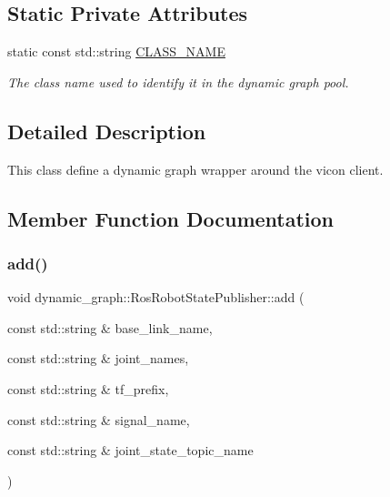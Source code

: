 \subsection*{Static Private Attributes}
\begin{DoxyCompactItemize}
\item 
\mbox{\label{classdynamic__graph_1_1RosRobotStatePublisher_a3794be6383ba4bc9a7412218a755f524}} 
static const std\+::string \hyperlink{classdynamic__graph_1_1RosRobotStatePublisher_a3794be6383ba4bc9a7412218a755f524}{C\+L\+A\+S\+S\+\_\+\+N\+A\+ME}
\begin{DoxyCompactList}\small\item\em The class name used to identify it in the dynamic graph pool. \end{DoxyCompactList}\end{DoxyCompactItemize}


\subsection{Detailed Description}
This class define a dynamic graph wrapper around the vicon client. 

\subsection{Member Function Documentation}
\mbox{\label{classdynamic__graph_1_1RosRobotStatePublisher_a92094934e53306e73b6fc13d1de61b3d}} 
\subsubsection{\texorpdfstring{add()}{add()}}
{\footnotesize\ttfamily void dynamic\+\_\+graph\+::\+Ros\+Robot\+State\+Publisher\+::add (\begin{DoxyParamCaption}\item[{const std\+::string \&}]{base\+\_\+link\+\_\+name,  }\item[{const std\+::string \&}]{joint\+\_\+names,  }\item[{const std\+::string \&}]{tf\+\_\+prefix,  }\item[{const std\+::string \&}]{signal\+\_\+name,  }\item[{const std\+::string \&}]{joint\+\_\+state\+\_\+topic\+\_\+name }\end{DoxyParamCaption})}



